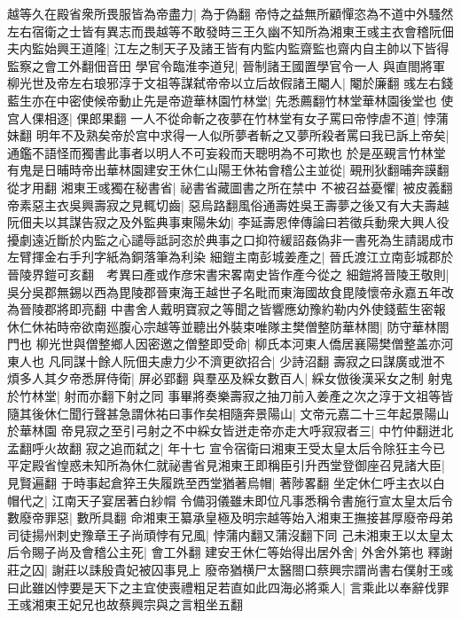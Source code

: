越等久在殿省衆所畏服皆為帝盡力|{
	為于偽翻}
帝恃之益無所顧憚恣為不道中外騷然左右宿衛之士皆有異志而畏越等不敢發時三王久幽不知所為湘東王彧主衣會稽阮佃夫内監始興王道隆|{
	江左之制天子及諸王皆有内監内監齋監也齋内自主帥以下皆得監察之會工外翻佃音田}
學官令臨淮李道兒|{
	晉制諸王國置學官令一人}
與直閤將軍柳光世及帝左右琅邪淳于文祖等謀弑帝帝以立后故假諸王閹人|{
	閹於廉翻}
彧左右錢藍生亦在中密使候帝動止先是帝遊華林園竹林堂|{
	先悉薦翻竹林堂華林園後堂也}
使宫人倮相逐|{
	倮郎果翻}
一人不從命斬之夜夢在竹林堂有女子罵曰帝悖虐不道|{
	悖蒲妹翻}
明年不及熟矣帝於宫中求得一人似所夢者斬之又夢所殺者罵曰我已訴上帝矣|{
	通鑑不語怪而獨書此事者以明人不可妄殺而天聰明為不可欺也}
於是巫覡言竹林堂有鬼是日晡時帝出華林園建安王休仁山陽王休祐會稽公主並從|{
	覡刑狄翻晡奔謨翻從才用翻}
湘東王彧獨在秘書省|{
	祕書省藏圖書之所在禁中}
不被召益憂懼|{
	被皮義翻}
帝素惡主衣吳興壽寂之見輒切齒|{
	惡烏路翻風俗通壽姓吳王壽夢之後又有大夫壽越}
阮佃夫以其謀告寂之及外監典事東陽朱幼|{
	李延壽恩倖傳論曰若徵兵動衆大興人役擾劇遠近斷於内監之心譴辱詆訶恣於典事之口抑符緩詔姦偽非一書死為生請謁成市左臂揮金右手刋字紙為銅落筆為利染}
細鎧主南彭城姜產之|{
	晉氏渡江立南彭城郡於晉陵界鎧可亥翻　考異曰產或作彦宋書宋畧南史皆作產今從之}
細鎧將晉陵王敬則|{
	吳分吳郡無錫以西為毘陵郡晉東海王越世子名毗而東海國故食毘陵懷帝永嘉五年改為晉陵郡將即亮翻}
中書舍人戴明寶寂之等聞之皆響應幼豫約勒内外使錢藍生密報休仁休祐時帝欲南廵腹心宗越等並聽出外裝束唯隊主樊僧整防華林閤|{
	防守華林閤門也}
柳光世與僧整鄉人因密邀之僧整即受命|{
	柳氏本河東人僑居襄陽樊僧整盖亦河東人也}
凡同謀十餘人阮佃夫慮力少不濟更欲招合|{
	少詩沼翻}
壽寂之曰謀廣或泄不煩多人其夕帝悉屏侍衛|{
	屏必郢翻}
與羣巫及綵女數百人|{
	綵女倣後漢采女之制}
射鬼於竹林堂|{
	射而亦翻下射之同}
事畢將奏樂壽寂之抽刀前入姜產之次之淳于文祖等皆隨其後休仁聞行聲甚急謂休祐曰事作矣相隨奔景陽山|{
	文帝元嘉二十三年起景陽山於華林園}
帝見寂之至引弓射之不中綵女皆迸走帝亦走大呼寂寂者三|{
	中竹仲翻迸北孟翻呼火故翻}
寂之追而弑之|{
	年十七}
宣令宿衛曰湘東王受太皇太后令除狂主今已平定殿省惶惑未知所為休仁就祕書省見湘東王即稱臣引升西堂登御座召見諸大臣|{
	見賢遍翻}
于時事起倉猝王失履跣至西堂猶著烏帽|{
	著陟畧翻}
坐定休仁呼主衣以白帽代之|{
	江南天子宴居著白紗㡌}
令備羽儀雖未即位凡事悉稱令書施行宣太皇太后令數廢帝罪惡|{
	數所具翻}
命湘東王纂承皇極及明宗越等始入湘東王撫接甚厚廢帝母弟司徒揚州刺史豫章王子尚頑悖有兄風|{
	悖蒲内翻又蒲沒翻下同}
己未湘東王以太皇太后令賜子尚及會稽公主死|{
	會工外翻}
建安王休仁等始得出居外舍|{
	外舍外第也}
釋謝莊之囚|{
	謝莊以誄殷貴妃被囚事見上}
廢帝猶横尸太醫閤口蔡興宗謂尚書右僕射王彧曰此雖凶悖要是天下之主宜使喪禮粗足若直如此四海必將乘人|{
	言乘此以奉辭伐罪王彧湘東王妃兄也故蔡興宗與之言粗坐五翻}

